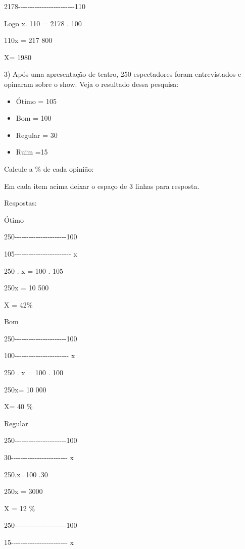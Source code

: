 2178-\/-\/-\/-\/-\/-\/-\/-\/-\/-\/-\/-\/-\/-\/-\/-\/-\/-\/-\/-\/-\/-\/-\/-110

Logo x. 110 = 2178 . 100

110x = 217 800

X= 1980

3) Após uma apresentação de teatro, 250 espectadores foram entrevistados
e opinaram sobre o show. Veja o resultado dessa pesquisa:

\begin{itemize}
\item
  Ótimo = 105
\item
  Bom = 100
\item
  Regular = 30
\item
  Ruim =15
\end{itemize}

Calcule a \% de cada opinião:

Em cada item acima deixar o espaço de 3 linhas para resposta.

Respostas:

Ótimo

250-\/-\/-\/-\/-\/-\/-\/-\/-\/-\/-\/-\/-\/-\/-\/-\/-\/-\/-\/-\/-\/-100

105-\/-\/-\/-\/-\/-\/-\/-\/-\/-\/-\/-\/-\/-\/-\/-\/-\/-\/-\/-\/-\/-\/-\/-
x

250 . x = 100 . 105

250x = 10 500

X = 42\%

Bom

250-\/-\/-\/-\/-\/-\/-\/-\/-\/-\/-\/-\/-\/-\/-\/-\/-\/-\/-\/-\/-\/-100

100-\/-\/-\/-\/-\/-\/-\/-\/-\/-\/-\/-\/-\/-\/-\/-\/-\/-\/-\/-\/-\/-\/- x

250 . x = 100 . 100

250x= 10 000

X= 40 \%

Regular

250-\/-\/-\/-\/-\/-\/-\/-\/-\/-\/-\/-\/-\/-\/-\/-\/-\/-\/-\/-\/-\/-100

30-\/-\/-\/-\/-\/-\/-\/-\/-\/-\/-\/-\/-\/-\/-\/-\/-\/-\/-\/-\/-\/-\/-\/-
x

250.x=100 .30

250x = 3000

X = 12 \%

250-\/-\/-\/-\/-\/-\/-\/-\/-\/-\/-\/-\/-\/-\/-\/-\/-\/-\/-\/-\/-\/-100

15-\/-\/-\/-\/-\/-\/-\/-\/-\/-\/-\/-\/-\/-\/-\/-\/-\/-\/-\/-\/-\/-\/-\/-
x

